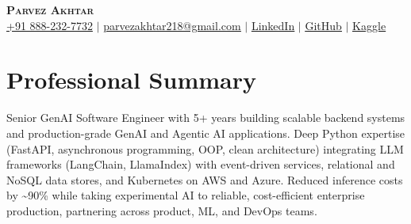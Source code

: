 \documentclass[11pt,a4paper]{article}
\begin{document}
\begin{center}
    \textbf{\Huge \scshape Parvez Akhtar} \\ \vspace{1pt}
    \small \href{tel:+918882327732}{+91 888-232-7732} $\vert$ \href{mailto:parvezakhtar218@gmail.com}{\underline{parvezakhtar218@gmail.com}} $\vert$
    \href{https://www.linkedin.com/in/parvezakhtar/}{\underline{LinkedIn}} $\vert$
    \href{https://github.com/ipmob}{\underline{GitHub}} $\vert$
    \href{https://www.kaggle.com/parvez218}{\underline{Kaggle}}
\end{center}

\section{Professional Summary}
\small{Senior GenAI Software Engineer with 5+ years building scalable backend systems and production-grade GenAI and Agentic AI applications. Deep Python expertise (FastAPI, asynchronous programming, OOP, clean architecture) integrating LLM frameworks (LangChain, LlamaIndex) with event-driven services, relational and NoSQL data stores, and Kubernetes on AWS and Azure. Reduced inference costs by \textasciitilde{}90\% while taking experimental AI to reliable, cost-efficient enterprise production, partnering across product, ML, and DevOps teams.}

\end{document}
